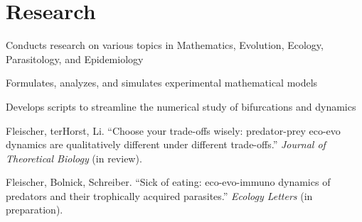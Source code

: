 \documentclass[letterpaper]{deedy-resume} %
\begin{document}
\begin{minipage}[t]{0.66\textwidth}
\vspace{5pt}

\section{Research}


\begin{tightitemize}
\item Conducts research on various topics in Mathematics, Evolution, Ecology, Parasitology, and Epidemiology
\item Formulates, analyzes, and simulates experimental mathematical models
\item Develops scripts to streamline the numerical study of bifurcations and dynamics
\end{tightitemize}

\vspace{5pt}
\location{}
\begin{tightitemize}
\item Fleischer, terHorst, Li. ``Choose your trade-offs wisely: predator-prey eco-evo dynamics are qualitatively different under different trade-offs.''  \emph{Journal of Theoretical Biology} (in review).
\item Fleischer, Bolnick, Schreiber. ``Sick of eating: eco-evo-immuno dynamics of predators and their trophically acquired parasites.'' \emph{Ecology Letters} (in preparation).
\end{tightitemize}




\end{minipage}
\end{document}
